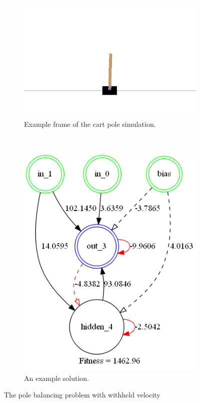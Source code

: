 \documentclass[letterpaper]{article}
\begin{document}
\begin{figure}[t]
	\centering
	\begin{subfigure}[b]{0.3\textwidth}
		\includegraphics[width=\textwidth]{images/pole_balance.png}
		\caption{Example frame of the cart pole simulation.}
	\end{subfigure}
	~
	\begin{subfigure}[b]{0.3\textwidth}
		\includegraphics[width=\textwidth]{images/cart_pole_final.png}
		\caption{An example solution.}
		\label{fig:cart_solution}
	\end{subfigure}
	\caption{The pole balancing problem with withheld velocity}
	\label{fig:cartpole}
\end{figure} 
\end{document}
